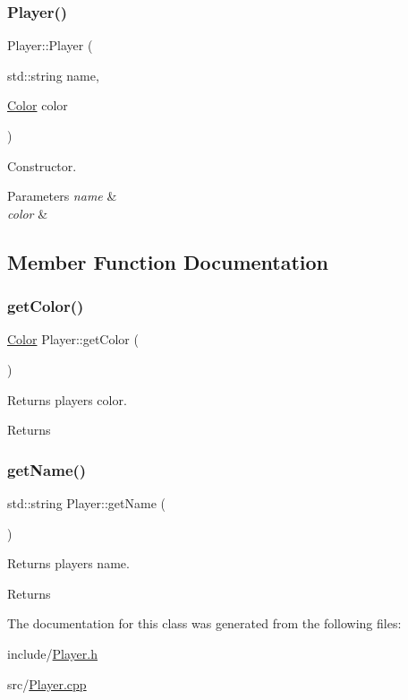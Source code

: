 \subsubsection{\texorpdfstring{Player()}{Player()}}
{\footnotesize\ttfamily Player\+::\+Player (\begin{DoxyParamCaption}\item[{std\+::string}]{name,  }\item[{\hyperlink{Enums_8h_ab87bacfdad76e61b9412d7124be44c1c}{Color}}]{color }\end{DoxyParamCaption})}



Constructor. 


\begin{DoxyParams}{Parameters}
{\em name} & \\
\hline
{\em color} & \\
\hline
\end{DoxyParams}


\subsection{Member Function Documentation}
\mbox{\label{classPlayer_abe2b0f82bdfeda3d872c772da40d5140}} 
\subsubsection{\texorpdfstring{get\+Color()}{getColor()}}
{\footnotesize\ttfamily \hyperlink{Enums_8h_ab87bacfdad76e61b9412d7124be44c1c}{Color} Player\+::get\+Color (\begin{DoxyParamCaption}{ }\end{DoxyParamCaption})}



Returns players color. 

\begin{DoxyReturn}{Returns}

\end{DoxyReturn}
\mbox{\label{classPlayer_af1aa472885d589516f483e26e786600e}} 
\subsubsection{\texorpdfstring{get\+Name()}{getName()}}
{\footnotesize\ttfamily std\+::string Player\+::get\+Name (\begin{DoxyParamCaption}{ }\end{DoxyParamCaption})}



Returns players name. 

\begin{DoxyReturn}{Returns}

\end{DoxyReturn}


The documentation for this class was generated from the following files\+:\begin{DoxyCompactItemize}
\item 
include/\hyperlink{Player_8h}{Player.\+h}\item 
src/\hyperlink{Player_8cpp}{Player.\+cpp}\end{DoxyCompactItemize}
